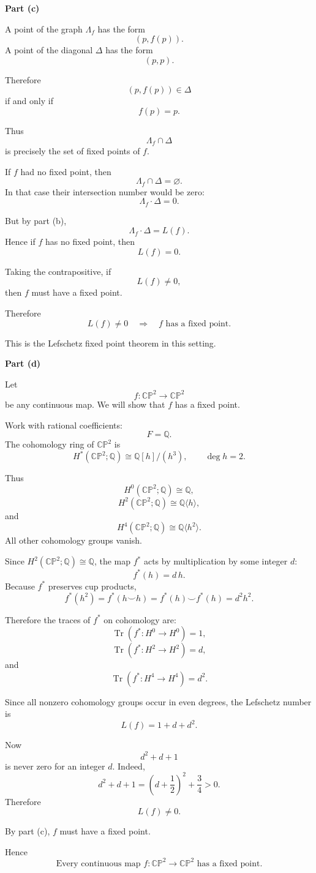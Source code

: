 \begin{solution}
\medskip
\noindent\textbf{Part (c)}\par
\smallskip


A point of the graph \(\Lambda_f\) has the form
\[
(p,f(p)).
\]
A point of the diagonal \(\Delta\) has the form
\[
(p,p).
\]

Therefore
\[
(p,f(p))\in \Delta
\]
if and only if
\[
f(p)=p.
\]

Thus
\[
\Lambda_f\cap \Delta
\]
is precisely the set of fixed points of \(f\).

If \(f\) had no fixed point, then
\[
\Lambda_f\cap \Delta=\varnothing.
\]
In that case their intersection number would be zero:
\[
\Lambda_f\cdot \Delta=0.
\]

But by part (b),
\[
\Lambda_f\cdot \Delta=L(f).
\]
Hence if \(f\) has no fixed point, then
\[
L(f)=0.
\]

Taking the contrapositive, if
\[
L(f)\neq 0,
\]
then \(f\) must have a fixed point.

Therefore
\[
\boxed{
	L(f)\neq 0
	\quad\Longrightarrow\quad
	f\text{ has a fixed point.}
}
\]

This is the Lefschetz fixed point theorem in this setting.


\medskip
\noindent\textbf{Part (d)}\par
\smallskip


Let
\[
f:\mathbb{CP}^2\to \mathbb{CP}^2
\]
be any continuous map. We will show that \(f\) has a fixed point.

Work with rational coefficients:
\[
F=\mathbb Q.
\]
The cohomology ring of \(\mathbb{CP}^2\) is
\[
H^*(\mathbb{CP}^2;\mathbb Q)
\cong
\mathbb Q[h]/(h^3),
\qquad
\deg h=2.
\]

Thus
\[
H^0(\mathbb{CP}^2;\mathbb Q)\cong \mathbb Q,
\]
\[
H^2(\mathbb{CP}^2;\mathbb Q)\cong \mathbb Q\langle h\rangle,
\]
and
\[
H^4(\mathbb{CP}^2;\mathbb Q)\cong \mathbb Q\langle h^2\rangle.
\]
All other cohomology groups vanish.

Since \(H^2(\mathbb{CP}^2;\mathbb Q)\cong \mathbb Q\), the map \(f^*\) acts by
multiplication by some integer \(d\):
\[
f^*(h)=d\,h.
\]
Because \(f^*\) preserves cup products,
\[
f^*(h^2)=f^*(h\smile h)=f^*(h)\smile f^*(h)=d^2h^2.
\]

Therefore the traces of \(f^*\) on cohomology are:
\[
\operatorname{Tr}(f^*:H^0\to H^0)=1,
\]
\[
\operatorname{Tr}(f^*:H^2\to H^2)=d,
\]
and
\[
\operatorname{Tr}(f^*:H^4\to H^4)=d^2.
\]

Since all nonzero cohomology groups occur in even degrees, the Lefschetz number
is
\[
L(f)=1+d+d^2.
\]

Now
\[
d^2+d+1
\]
is never zero for an integer \(d\). Indeed,
\[
d^2+d+1
=
\left(d+\frac12\right)^2+\frac34
>0.
\]
Therefore
\[
L(f)\neq 0.
\]

By part (c), \(f\) must have a fixed point.

Hence
\[
\boxed{
	\text{Every continuous map }
	f:\mathbb{CP}^2\to \mathbb{CP}^2
	\text{ has a fixed point.}
}
\]
\end{solution}
